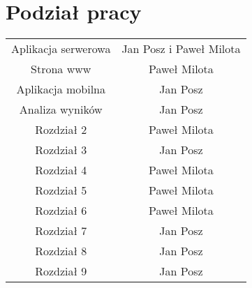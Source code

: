 \chapter{Podział pracy}
\label{cha:podzial_prac}

\begin{center}
\begin{tabular}{ |c|c| } 
 \hline
 Aplikacja serwerowa & Jan Posz i Paweł Milota \\ 
 Strona www & Paweł Milota \\ 
 Aplikacja mobilna & Jan Posz \\ 
 Analiza wyników & Jan Posz \\
 Rozdział 2 & Paweł Milota \\ 
 Rozdział 3 & Jan Posz \\ 
 Rozdział 4 & Paweł Milota \\
 Rozdział 5 & Paweł Milota \\
 Rozdział 6 & Paweł Milota \\
 Rozdział 7 & Jan Posz \\
 Rozdział 8 & Jan Posz \\
 Rozdział 9 & Jan Posz \\
 \hline
\end{tabular}
\end{center}
